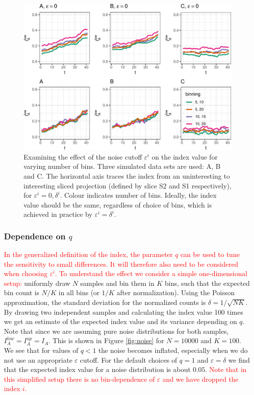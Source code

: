 \documentclass[]{interact}
\theoremstyle{plain}%
\theoremstyle{definition}
\theoremstyle{remark}
\begin{document}
\begin{figure}

{\centering \includegraphics[width=0.9\linewidth]{section_pursuit_files/figure-latex/path_eps-1} 

}

\caption{Examining the effect of the noise cutoff $\varepsilon^i$ on the index value for varying number of bins. Three simulated data sets are used:  A, B and C. The horizontal axis traces the index from an uninteresting to interesting sliced projection (defined by slice S2 and S1 respectively), for $\varepsilon^i=0, \delta^i$. Colour indicates number of bins. Ideally, the index value should be the same, regardless of choice of bins, which is achieved in practice by $\varepsilon^i=\delta^i$.}\label{fig:path_eps}
\end{figure}

\hypertarget{dependenceq}{%
\subsubsection*{\texorpdfstring{Dependence on
\(q\)}{Dependence on q}}\label{dependenceq}}

\textcolor{red}{In the generalized definition of the index, the parameter $q$ can be used to tune the sensitivity to small differences. It will therefore also need to be considered when choosing $\varepsilon^i$. To understand the effect we consider a simple one-dimensional setup:}
uniformly draw \(N\) samples and bin them in \(K\) bins, such that the
expected bin count is \(N/K\) in all bins (or \(1/K\) after
normalization). Using the Poisson approximation, the standard deviation
for the normalized counts is \(\delta=1/\sqrt{N K}\). By drawing two
independent samples and calculating the index value 100 times we get an
estimate of the expected index value and its variance depending on
\(q\). Note that since we are assuming pure noise distributions for both
samples, \(I_A^{low}=I_A^{up}=I_A\). This is shown in Figure
\ref{fig:noise} for \(N=10000\) and \(K=100\). We see that for values of
\(q<1\) the noise becomes inflated, especially when we do not use an
appropriate \(\varepsilon\) cutoff. For the default choices of \(q=1\)
and \(\varepsilon=\delta\) we find that the expected index value for a
noise distribution is about \(0.05\).
\textcolor{red}{Note that in this simplified setup there is no bin-dependence of $\varepsilon$ and we have dropped the index $i$.}
\end{document}
